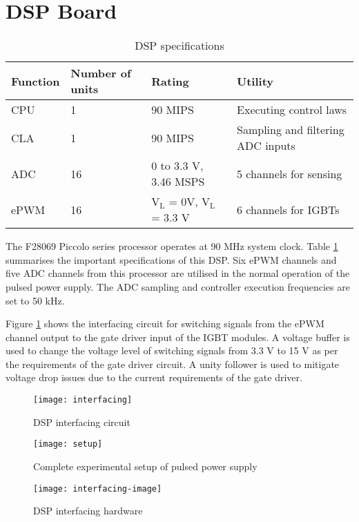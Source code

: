 	\section{DSP Board}
	\begin{table}[h]
	\begin{tabular}{|l|l|l|l|} \hline
	\textbf{Function} & \textbf{Number of units} & \textbf{Rating} & \textbf{Utility} \\ \hline
	CPU & 1 & 90 MIPS & Executing control laws \\ \hline
	CLA & 1 & 90 MIPS & Sampling and filtering ADC inputs \\ \hline
	ADC & 16 & 0 to 3.3 V, 3.46 MSPS & 5 channels for sensing\\ \hline
	ePWM & 16 & $\text{V}_\text{L}$ = 0V, $\text{V}_\text{L}$ = 3.3 V & 6 channels for IGBTs\\ \hline
	\end{tabular}
	\caption{DSP specifications}
	\label{tab:dsp}
	\end{table}
	
    The F28069 Piccolo series processor operates at 90 MHz system clock. Table \ref{tab:dsp} summarises the important specifications of this DSP. Six ePWM channels and five ADC channels from this processor are utilised in the normal operation of the pulsed power supply. The ADC sampling and controller execution frequencies are set to 50 kHz.

    Figure \ref{fig:interfacing} shows the interfacing circuit for switching signals from the ePWM channel output to the gate driver input of the IGBT modules. A voltage buffer is used to change the voltage level of switching signals from 3.3 V to 15 V as per the requirements of the gate driver circuit. A unity follower is used to mitigate voltage drop issues due to the current requirements of the gate driver.

	\begin{figure}[h]
        \centering
        \texttt{[image: interfacing]}
        \caption{DSP interfacing circuit}
        \label{fig:interfacing}
    \end{figure}
	\begin{figure}[h]
        \centering
        \texttt{[image: setup]}
        \caption{Complete experimental setup of pulsed power supply}
        \label{fig:setup}
    \end{figure}
    \begin{figure}[h]
        \centering
        \texttt{[image: interfacing-image]}
        \caption{DSP interfacing hardware}
        \label{fig:interfacing-image}
    \end{figure}
